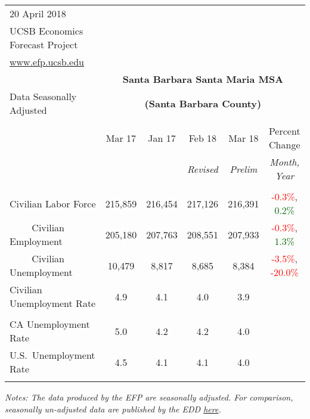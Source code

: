 \documentclass[12pt]{article}
\begin{document}
\begin{table}
\begin{tabular}{|l|c|c|c|c|c|}
\multicolumn{1}{l}{\small 20 April 2018} & \multicolumn{5}{c}{} \\
\multicolumn{1}{l}{\small UCSB Economics Forecast Project} & \multicolumn{5}{c}{} \\
\multicolumn{1}{l}{\small \href{http://www.efp.ucsb.edu/}{www.efp.ucsb.edu}} & \multicolumn{5}{c}{} \\
\multicolumn{1}{c}{} & \multicolumn{5}{c}{\large \textbf{Santa Barbara Santa Maria MSA}} \\
\multicolumn{1}{l}{\small Data Seasonally Adjusted} & \multicolumn{5}{c}{\small \textbf{(Santa Barbara County)}} \\ \hline \hline
& & & & & \\
 & Mar 17 & Jan 17 & Feb 18 & Mar 18 & Percent Change \\
 & & & \small \textit{Revised} & \small \textit{Prelim} & \small \textit{Month, Year} \\ \hline
& & & & & \\
Civilian Labor Force & 215,859 & 216,454 & 217,126 & 216,391 & \textcolor{red}{-0.3\%}, \textcolor{darkgreen}{0.2\%} \\
$\qquad$ \small Civilian Employment & 205,180 & 207,763 & 208,551 & 207,933 & \textcolor{red}{-0.3\%}, \textcolor{darkgreen}{1.3\%} \\
$\qquad$ \small Civilian Unemployment & 10,479 & 8,817 & 8,685 & 8,384 & \textcolor{red}{-3.5\%}, \textcolor{red}{-20.0\%} \\
Civilian Unemployment Rate & 4.9 & 4.1 & 4.0 & 3.9 & \\
& & & & & \\
CA Unemployment Rate & 5.0 & 4.2 & 4.2 & 4.0 & \\
U.S.\ Unemployment Rate & 4.5 & 4.1 & 4.1 & 4.0 & \\
& & & & & \\ \hline \hline
\end{tabular}
\par
\vspace{.5em}
\footnotesize
\textit{Notes: The data produced by the EFP are seasonally adjusted. For comparison, seasonally un-adjusted data are published by the EDD \href{http://www.labormarketinfo.ca.gov/file/lfmonth/satb$pds.pdf}{here}.}
\end{table}
\end{document}
